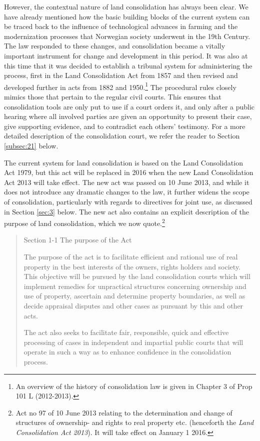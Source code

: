 However, the contextual nature of land consolidation has always been clear. We have already mentioned how the basic building blocks of the current system can be traced back to the influence of technological advances in farming and the modernization processes that Norwegian society underwent in the 19th Century. The law responded to these changes, and consolidation became a vitally important instrument for change and development in this period. It was also at this time that it was decided to establish a tribunal system for administering the process, first in the Land Consolidation Act from 1857 and then revised and developed further in acts from 1882 and 1950.\footnote{An overview of the history of consolidation law is given in Chapter 3 of Prop 101 L (2012-2013).} The procedural rules closely mimics those that pertain to the regular civil courts. This ensures that consolidation tools are only put to use if a court orders it, and only after a public hearing where all involved parties are given an opportunity to present their case, give supporting evidence, and to contradict each others' testimony. For a more detailed description of the consolidation court, we refer the reader to Section \ref{subsec:21} below.

The current system for land consolidation is based on the Land Consolidation Act 1979, but this act will be replaced in 2016 when the new Land Consolidation Act 2013 will take effect. The new act was passed on 10 June 2013, and while it does not introduce any dramatic changes to the law, it further widens the scope of consolidation, particularly with regards to directives for joint use, as discussed in Section \ref{sec:3} below. The new act also contains an explicit description of the purpose of land consolidation, which we now quote.\footnote{Act no 97 of 10 June 2013 relating to the determination and change of structures of ownership- and rights to real property etc. (henceforth the \emph{Land Consolidation Act 2013}). It will take effect on January 1 2016.}

\begin{quote}
Section 1-1 The purpose of the Act

The purpose of the act is to facilitate efficient and rational use of real property in the best interests of the owners, rights holders and society. This objective will be pursued by the land consolidation courts which will implement remedies for unpractical structures concerning ownership and use of property, ascertain and determine property boundaries, as well as decide appraisal disputes and other cases as pursuant by this and other acts.

The act also seeks to facilitate fair, responsible, quick and effective processing of cases in independent and impartial public courts that will operate in such a way as to enhance confidence in the consolidation process.
\end{quote}

